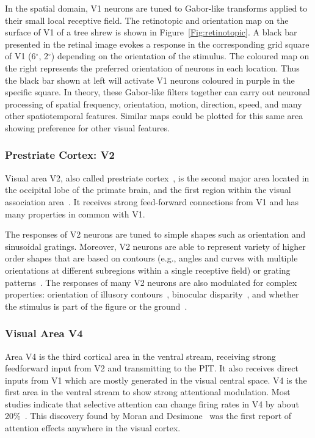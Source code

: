In the spatial domain, V1 neurons are tuned to Gabor-like transforms applied to their small local receptive field.
The retinotopic and orientation map on the surface of V1 of a tree shrew is shown in Figure~\ref{Fig:retinotopic}.
A black bar presented in the retinal image evokes a response in the corresponding grid square of V1 (6$^\circ$, 2$^\circ$) depending on the orientation of the stimulus.
The coloured map on the right represents the preferred orientation of neurons in each location.
Thus the black bar shown at left will activate V1 neurons coloured in purple in the specific square.
In theory, these Gabor-like filters together can carry out neuronal processing of spatial frequency, orientation, motion, direction, speed, and many other spatiotemporal features.
Similar maps could be plotted for this same area showing preference for other visual features.

\subsubsection{Prestriate Cortex: V2}
Visual area V2, also called prestriate cortex~\cite{an2012distinct}, is the second major area located in the occipital lobe of the primate brain, and the first region within the visual association area~\cite{wu2011early}. 
It receives strong feed-forward connections from V1 and has many properties in common with V1. 

The responses of V2 neurons are tuned to simple shapes such as orientation and sinusoidal gratings. 
Moreover, V2 neurons are able to represent variety of higher order shapes that are based on contours (e.g., angles and curves with multiple orientations at different subregions within a single receptive field) or grating patterns~\cite{hegde2000selectivity}.
The responses of many V2 neurons are also modulated for complex properties: orientation of illusory contours~\cite{anzai2007neurons}, binocular disparity~\cite{daniel2009whither}, and whether the stimulus is part of the figure or the ground~\cite{qiu2005figure}.


\subsubsection{Visual Area V4}
Area V4 is the third cortical area in the ventral stream, receiving strong feedforward input from V2 and transmitting to the PIT.
It also receives direct inputs from V1 which are mostly generated in the visual central space.
V4 is the first area in the ventral stream to show strong attentional modulation.
Most studies indicate that selective attention can change firing rates in V4 by about 20\%~\cite{filipe2013human}.
This discovery found by Moran and Desimone~\cite{moran1985selective} was the first report of attention effects anywhere in the visual cortex.

